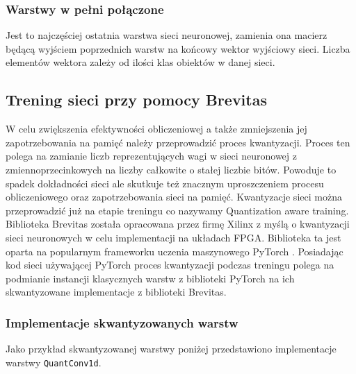\documentclass[../main.tex]{subfiles}
\begin{document}
\subsubsection{Warstwy w pełni połączone}

Jest to najczęściej ostatnia warstwa sieci neuronowej, zamienia ona macierz będącą wyjściem poprzednich warstw na końcowy wektor wyjściowy sieci. Liczba elementów wektora zależy od ilości klas obiektów w danej sieci.

\subsection{Trening sieci przy pomocy Brevitas}

W celu zwiększenia efektywności obliczeniowej a także zmniejszenia jej zapotrzebowania na pamięć należy przeprowadzić proces kwantyzacji. Proces ten polega na zamianie liczb reprezentujących wagi w sieci neuronowej
z zmiennoprzecinkowych na liczby całkowite o stałej liczbie bitów. Powoduje to spadek dokładności sieci ale skutkuje też znacznym uproszczeniem procesu obliczeniowego oraz zapotrzebowania sieci na pamięć. Kwantyzacje sieci można
przeprowadzić już na etapie treningu co nazywamy Quantization aware training. Biblioteka Brevitas \cite{brevitas} została opracowana przez firmę Xilinx z myślą o kwantyzacji sieci neuronowych w celu implementacji na układach FPGA.
Biblioteka ta jest oparta na popularnym frameworku uczenia maszynowego PyTorch \cite{NEURIPS2019_9015}. Posiadając kod sieci używającej PyTorch proces kwantyzacji podczas treningu polega na podmianie instancji klasycznych
warstw z biblioteki PyTorch na ich skwantyzowane implementacje z biblioteki Brevitas.

\subsubsection{Implementacje skwantyzowanych warstw}

Jako przykład skwantyzowanej warstwy poniżej przedstawiono implementacje warstwy \texttt{QuantConv1d}.
\end{document}
